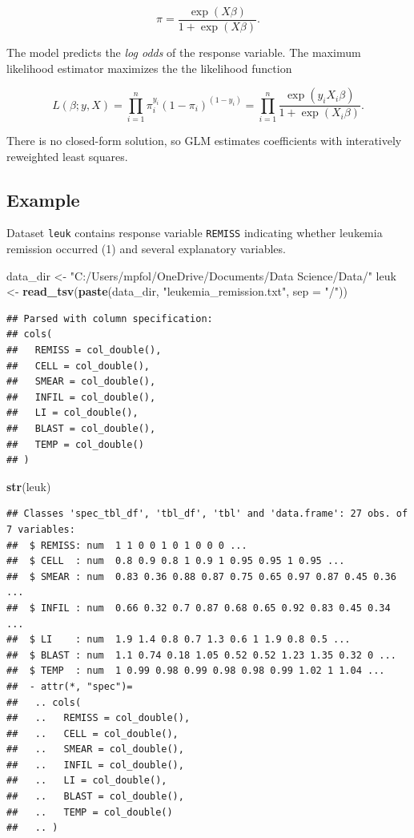 \documentclass[
]{book}
\newenvironment{Shaded}{\begin{snugshade}}{\end{snugshade}}
\newcommand{\DataTypeTok}[1]{\textcolor[rgb]{0.13,0.29,0.53}{#1}}
\newcommand{\KeywordTok}[1]{\textcolor[rgb]{0.13,0.29,0.53}{\textbf{#1}}}
\newcommand{\NormalTok}[1]{#1}
\newcommand{\StringTok}[1]{\textcolor[rgb]{0.31,0.60,0.02}{#1}}
\begin{document}
\[\pi = \frac{\exp(X \beta)}{1 + \exp(X \beta)}.\]

The model predicts the \emph{log odds} of the response variable. The maximum likelihood estimator maximizes the the likelihood function

\[L(\beta; y, X) = \prod_{i=1}^n \pi_i^{y_i}(1 - \pi_i)^{(1-y_i)} = \prod_{i=1}^n\frac{\exp(y_i X_i \beta)}{1 + \exp(X_i \beta)}.\]

There is no closed-form solution, so GLM estimates coefficients with interatively reweighted least squares.

\hypertarget{example-16}{%
\subsection*{Example}\label{example-16}}

Dataset \texttt{leuk} contains response variable \texttt{REMISS} indicating whether leukemia remission occurred (1) and several explanatory variables.

\begin{Shaded}
\begin{Highlighting}[]
\NormalTok{data_dir <-}\StringTok{ "C:/Users/mpfol/OneDrive/Documents/Data Science/Data/"}
\NormalTok{leuk <-}\StringTok{ }\KeywordTok{read_tsv}\NormalTok{(}\KeywordTok{paste}\NormalTok{(data_dir, }\StringTok{"leukemia_remission.txt"}\NormalTok{, }\DataTypeTok{sep =} \StringTok{"/"}\NormalTok{))}
\end{Highlighting}
\end{Shaded}

\begin{verbatim}
## Parsed with column specification:
## cols(
##   REMISS = col_double(),
##   CELL = col_double(),
##   SMEAR = col_double(),
##   INFIL = col_double(),
##   LI = col_double(),
##   BLAST = col_double(),
##   TEMP = col_double()
## )
\end{verbatim}

\begin{Shaded}
\begin{Highlighting}[]
\KeywordTok{str}\NormalTok{(leuk)}
\end{Highlighting}
\end{Shaded}

\begin{verbatim}
## Classes 'spec_tbl_df', 'tbl_df', 'tbl' and 'data.frame': 27 obs. of  7 variables:
##  $ REMISS: num  1 1 0 0 1 0 1 0 0 0 ...
##  $ CELL  : num  0.8 0.9 0.8 1 0.9 1 0.95 0.95 1 0.95 ...
##  $ SMEAR : num  0.83 0.36 0.88 0.87 0.75 0.65 0.97 0.87 0.45 0.36 ...
##  $ INFIL : num  0.66 0.32 0.7 0.87 0.68 0.65 0.92 0.83 0.45 0.34 ...
##  $ LI    : num  1.9 1.4 0.8 0.7 1.3 0.6 1 1.9 0.8 0.5 ...
##  $ BLAST : num  1.1 0.74 0.18 1.05 0.52 0.52 1.23 1.35 0.32 0 ...
##  $ TEMP  : num  1 0.99 0.98 0.99 0.98 0.98 0.99 1.02 1 1.04 ...
##  - attr(*, "spec")=
##   .. cols(
##   ..   REMISS = col_double(),
##   ..   CELL = col_double(),
##   ..   SMEAR = col_double(),
##   ..   INFIL = col_double(),
##   ..   LI = col_double(),
##   ..   BLAST = col_double(),
##   ..   TEMP = col_double()
##   .. )
\end{verbatim}
\end{document}
